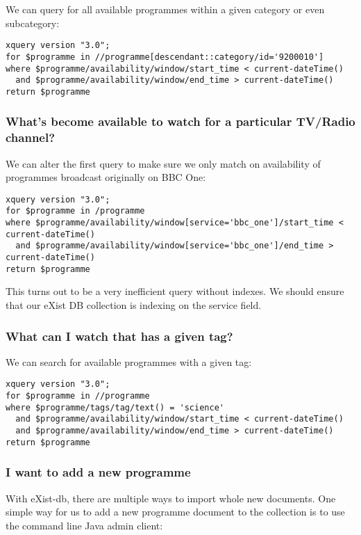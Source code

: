 \documentclass[11pt,a4paper]{article}
\begin{document}
We can query for all available programmes within a given category or even subcategory:

\begin{lstlisting}
xquery version "3.0";
for $programme in //programme[descendant::category/id='9200010']
where $programme/availability/window/start_time < current-dateTime()
  and $programme/availability/window/end_time > current-dateTime()
return $programme
\end{lstlisting}

\subsubsection{What's become available to watch for a particular TV/Radio channel?}

We can alter the first query to make sure we only match on availability of
programmes broadcast originally on BBC One:

\begin{lstlisting}
xquery version "3.0";
for $programme in /programme
where $programme/availability/window[service='bbc_one']/start_time < current-dateTime()
  and $programme/availability/window[service='bbc_one']/end_time > current-dateTime()
return $programme
\end{lstlisting}

This turns out to be a very inefficient query without indexes. We should ensure
that our eXist DB collection is indexing on the service field.

\subsubsection{What can I watch that has a given tag?}

We can search for available programmes with a given tag:

\begin{lstlisting}
xquery version "3.0";
for $programme in //programme
where $programme/tags/tag/text() = 'science'
  and $programme/availability/window/start_time < current-dateTime()
  and $programme/availability/window/end_time > current-dateTime()
return $programme
\end{lstlisting}

\subsubsection{I want to add a new programme}

With eXist-db, there are multiple ways to import whole new documents. One
simple way for us to add a new programme document to the collection
is to use the command line Java admin client:
\end{document}
